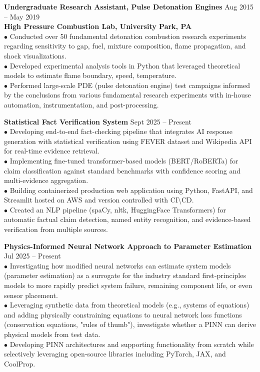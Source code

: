 \documentclass[10pt]{article}
\renewcommand{\section}[2]%
        {\pagebreak[3]\vspace{0.75\baselineskip}%
         \phantomsection\addcontentsline{toc}{section}{#1}%
         \hspace{0in}%
         \marginpar{
         \raggedright \small \scshape #1}#2}
\newcommand{\blankline}{\quad\pagebreak[2]\vspace{-0.3\baselineskip}}
\begin{document}
\blankline

\textbf{Undergraduate Research Assistant, Pulse Detonation Engines}
\hfill Aug 2015 -- May 2019 \\
\textbf{High Pressure Combustion Lab, University Park, PA} \\
$\bullet$ Conducted over 50 fundamental detonation combustion research experiments regarding sensitivity to gap, fuel, mixture composition, flame propagation, and shock visualizations. \\
$\bullet$ Developed experimental analysis tools in Python that leveraged theoretical models to estimate flame boundary, speed, temperature. \\
$\bullet$ Performed large-scale PDE (pulse detonation engine) test campaigns informed by the conclusions from various fundamental research experiments with in-house automation, instrumentation, and post-processing.

\section{Projects}


\textbf{Statistical Fact Verification System} \hfill Sept 2025 -- Present \\
$\bullet$ Developing end-to-end fact-checking pipeline that integrates AI response generation with statistical verification using FEVER dataset and Wikipedia API for real-time evidence retrieval. \\
$\bullet$ Implementing fine-tuned transformer-based models (BERT/RoBERTa) for claim classification against standard benchmarks with confidence scoring and multi-evidence aggregation. \\
$\bullet$ Building containerized production web application using Python, FastAPI, and Streamlit hosted on AWS and version controlled with CI\textbackslash CD. \\
$\bullet$ Created an NLP pipeline (spaCy, nltk, HuggingFace Transformers) for automatic factual claim detection, named entity recognition, and evidence-based verification from multiple sources.

\blankline

\textbf{Physics-Informed Neural Network Approach to Parameter Estimation}
\hfill Jul 2025 -- Present \\
$\bullet$ Investigating how modified neural networks can estimate system models (parameter estimation) as a surrogate for the industry standard first-principles models to more rapidly predict system failure, remaining component life, or even sensor placement. \\
$\bullet$ Leveraging synthetic data from theoretical models (e.g., systems of equations) and adding physically constraining equations to neural network loss functions (conservation equations, "rules of thumb"), investigate whether a PINN can derive physical models from test data. \\
$\bullet$ Developing PINN architectures and supporting functionality from scratch while selectively leveraging open-source libraries including PyTorch, JAX, and CoolProp.
\end{document}
